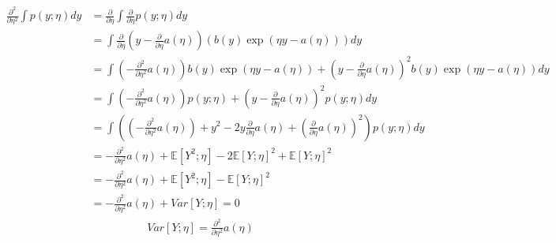 \begin{answer}
\begin{align*}
\frac{\partial^2}{\partial \eta^2} \int p(y;\eta) dy&=\frac{\partial}{\partial \eta}\int\frac{\partial}{\partial \eta} p(y;\eta) dy\\
&=\int\frac{\partial}{\partial \eta}\left(y-\frac{\partial}{\partial \eta}a(\eta)\right)\left(b(y)\exp(\eta y - a(\eta))\right) dy\\
&=\int\left(-\frac{\partial^2}{\partial\eta^2}a(\eta)\right)b(y)\exp(\eta y - a(\eta))+\left(y-\frac{\partial}{\partial \eta}a(\eta)\right)^2b(y)\exp(\eta y - a(\eta))dy\\
&=\int\left(-\frac{\partial^2}{\partial\eta^2}a(\eta)\right)p(y;\eta)+\left(y-\frac{\partial}{\partial \eta}a(\eta)\right)^2p(y;\eta)dy\\
&=\int\left(\left(-\frac{\partial^2}{\partial\eta^2}a(\eta)\right)+y^2-2y\frac{\partial}{\partial \eta}a(\eta)+\left(\frac{\partial}{\partial \eta}a(\eta)\right)^2\right)p(y;\eta)dy\\
&=-\frac{\partial^2}{\partial\eta^2}a(\eta)+\mathbb{E}[Y^2; \eta]-2\mathbb{E}[Y; \eta]^2+\mathbb{E}[Y; \eta]^2\\
&=-\frac{\partial^2}{\partial\eta^2}a(\eta)+\mathbb{E}[Y^2; \eta]-\mathbb{E}[Y; \eta]^2\\
&=-\frac{\partial^2}{\partial\eta^2}a(\eta)+Var[Y; \eta]=0
\end{align*}
\begin{align*}
Var[Y; \eta]=\frac{\partial^2}{\partial \eta^2}a(\eta)
\end{align*}
\end{answer}
